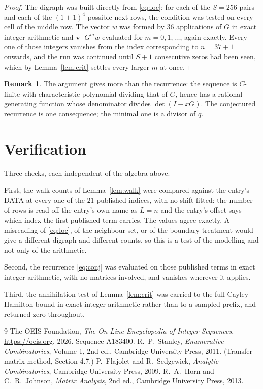 \documentclass[11pt,a4paper]{article}
\theoremstyle{plain}
\theoremstyle{definition}
\newtheorem{remark}[theorem]{Remark}
\begin{document}
\begin{proof}
The digraph was built directly from \eqref{eq:loc}: for each of the $S=256$ pairs and each
of the $(1+1)^{4}$ possible next rows, the condition was tested on every cell of
the middle row. The vector $w$ was formed by $36$ applications of $G$ in exact integer
arithmetic and $\mathbf{v}^{\!\top}G^{m}w$ evaluated for $m=0,1,\dots$, again exactly.
Every one of those integers vanishes from the index corresponding to $n=37+1$ onwards,
and the run was continued until $S+1$ consecutive zeros had been seen, which by
Lemma~\ref{lem:crit} settles every larger $m$ at once.
\end{proof}

\begin{remark}
The argument gives more than the recurrence: the sequence is $C$-finite with characteristic
polynomial dividing that of $G$, hence has a rational generating function whose denominator
divides $\det(I-xG)$. The conjectured recurrence is one consequence; the minimal one is a
divisor of $q$.
\end{remark}

\section{Verification}

Three checks, each independent of the algebra above.

First, the walk counts of Lemma~\ref{lem:walk} were compared against the entry's DATA at
every one of the $21$ published indices, with no shift fitted: the number of rows is
read off the entry's own name as $L=n$ and the entry's offset says which index the first
published term carries. The values agree exactly. A misreading of \eqref{eq:loc}, of the
neighbour set, or of the boundary treatment would give a different digraph and different
counts, so this is a test of the modelling and not only of the arithmetic.

Second, the recurrence \eqref{eq:conj} was evaluated on those published terms in exact
integer arithmetic, with no matrices involved, and vanishes wherever it applies.

Third, the annihilation test of Lemma~\ref{lem:crit} was carried to the full
Cayley--Hamilton bound in exact integer arithmetic rather than to a sampled prefix, and
returned zero throughout.

\begin{thebibliography}{9}
 The OEIS Foundation, \emph{The On-Line Encyclopedia of Integer
Sequences}, \url{https://oeis.org}, 2026. Sequence A183400.
 R.~P.~Stanley, \emph{Enumerative Combinatorics}, Volume 1, 2nd ed.,
Cambridge University Press, 2011. (Transfer-matrix method, Section 4.7.)
 P.~Flajolet and R.~Sedgewick, \emph{Analytic Combinatorics}, Cambridge
University Press, 2009.
 R.~A.~Horn and C.~R.~Johnson, \emph{Matrix Analysis}, 2nd ed., Cambridge
University Press, 2013.
\end{thebibliography}
\end{document}

